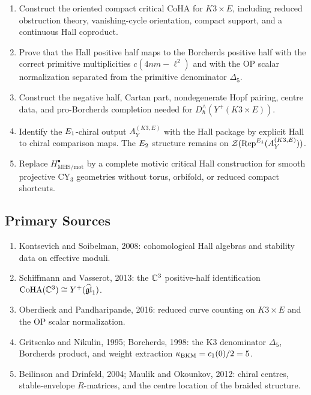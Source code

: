 \begin{enumerate}
 \item Construct the oriented compact critical CoHA for
 \(K3\times E\), including reduced obstruction theory, vanishing-cycle
 orientation, compact support, and a continuous Hall coproduct.
 \item Prove that the Hall positive half maps to the Borcherds
 positive half with the correct primitive multiplicities
 \(c(4nm-\ell^2)\) and with the OP scalar normalization separated
 from the primitive denominator \(\Delta_5\).
 \item Construct the negative half, Cartan part, nondegenerate Hopf
 pairing, centre data, and pro-Borcherds completion needed for
 \(D^\wedge_\hbar(Y^+(K3\times E))\).
 \item Identify the \(E_1\)-chiral output
 \(A_Y^{(K3,E)}\) with the Hall package by explicit Hall to chiral
 comparison maps. The \(E_2\) structure remains on
 \(\mathcal{Z}(\mathrm{Rep}^{E_1}(A_Y^{(K3,E)}))\).
 \item Replace \(H^\bullet_{\mathrm{MHS/mot}}\) by a complete motivic
 critical Hall construction for smooth projective CY$_3$ geometries
 without torus, orbifold, or reduced compact shortcuts.
\end{enumerate}

\subsection*{Primary Sources}
\label{note:primary-sources}

\begin{enumerate}
 \item Kontsevich and Soibelman, 2008: cohomological Hall algebras and
 stability data on effective moduli.
 \item Schiffmann and Vasserot, 2013: the \(\mathbb{C}^3\) positive-half
 identification \(\mathrm{CoHA}(\mathbb{C}^3)\cong Y^{+}(\widehat{\mathfrak{gl}}_1)\).
 \item Oberdieck and Pandharipande, 2016: reduced curve counting on
 \(K3\times E\) and the OP scalar normalization.
 \item Gritsenko and Nikulin, 1995; Borcherds, 1998: the K3
 denominator \(\Delta_5\), Borcherds product, and weight extraction
 \(\kappa_{\mathrm{BKM}}=c_1(0)/2=5\).
 \item Beilinson and Drinfeld, 2004; Maulik and Okounkov, 2012:
 chiral centres, stable-envelope \(R\)-matrices, and the centre
 location of the braided structure.
\end{enumerate}
